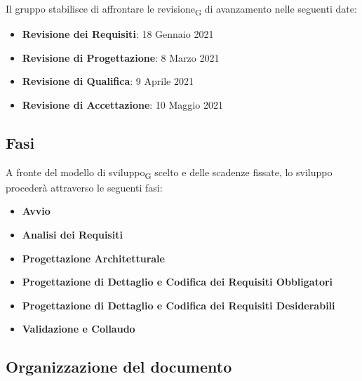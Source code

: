 Il gruppo stabilisce di affrontare le revisione\textsubscript{G} di avanzamento nelle seguenti date:
\begin{itemize}
	\item \textbf{Revisione dei Requisiti}: 18 Gennaio 2021
	\item \textbf{Revisione di Progettazione}: 8 Marzo 2021 
	\item \textbf{Revisione di Qualifica}: 9 Aprile 2021
	\item \textbf{Revisione di Accettazione}: 10 Maggio 2021	
\end{itemize}


\subsection{Fasi}

A fronte del modello di sviluppo\textsubscript{G} scelto e delle scadenze fissate, lo sviluppo procederà attraverso le seguenti fasi:
\begin{itemize}
	\item \textbf{Avvio}
	\item \textbf{Analisi dei Requisiti}
	\item \textbf{Progettazione Architetturale}
	\item \textbf{Progettazione di Dettaglio e Codifica dei Requisiti Obbligatori}
	\item \textbf{Progettazione di Dettaglio e Codifica dei Requisiti Desiderabili}
	\item \textbf{Validazione e Collaudo}
\end{itemize}



\subsection{Organizzazione del documento}

